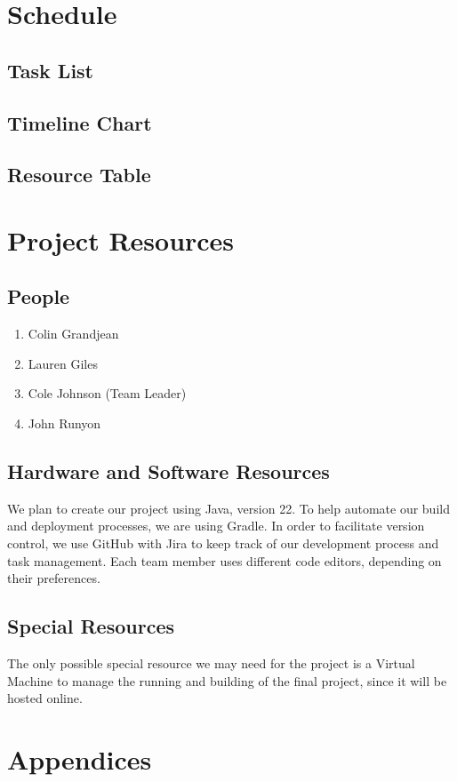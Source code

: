 \documentclass[english,12pt]{article}
\begin{document}
\section{Schedule}

\subsection{Task List}

\subsection{Timeline Chart}

\subsection{Resource Table}

\section{Project Resources}

\subsection{People}
\begin{enumerate}
  \item Colin Grandjean 
  \item Lauren Giles   
  \item Cole Johnson (Team Leader)
  \item John Runyon    
\end{enumerate}
\subsection{Hardware and Software Resources}
We plan to create our project using Java, version 22. 
To help automate our build and deployment processes, we are using Gradle. 
In order to facilitate version control, we use GitHub with Jira to keep track of our 
development process and task management. Each team member uses different 
code editors, depending on their preferences.

\subsection{Special Resources}
The only possible special resource we may need for the project is a Virtual Machine 
to manage the running and building of the final project, since it will be hosted online.

\section{Appendices}
\end{document}
